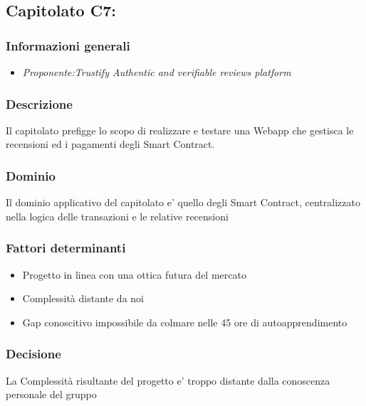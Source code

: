 \subsection{Capitolato C7: \textit{}}
\subsubsection{Informazioni generali}
\begin{itemize}
    \item \textit{Proponente:Trustify Authentic and verifiable reviews platform }
\end{itemize}
\subsubsection{Descrizione}
Il capitolato prefigge lo scopo di realizzare e testare una Webapp che gestisca le recensioni ed i pagamenti degli Smart Contract.
\subsubsection{Dominio}
Il dominio applicativo del capitolato e' quello degli Smart Contract, centralizzato nella logica delle transazioni e le relative recensioni
\subsubsection{Fattori determinanti}
\begin{itemize}
    \item Progetto in linea con una ottica futura del mercato
    \item Complessità distante da noi
    \item Gap conoscitivo impossibile da colmare nelle 45 ore di autoapprendimento
\end{itemize}
\subsubsection{Decisione}
La Complessità risultante del progetto e' troppo distante dalla conoscenza personale del gruppo
